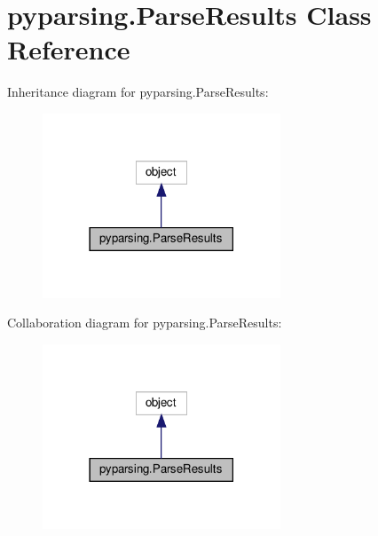 \hypertarget{classpyparsing_1_1ParseResults}{}\section{pyparsing.\+Parse\+Results Class Reference}
\label{classpyparsing_1_1ParseResults}


Inheritance diagram for pyparsing.\+Parse\+Results\+:
\nopagebreak
\begin{figure}[H]
\begin{center}
\leavevmode
\includegraphics[width=201pt]{classpyparsing_1_1ParseResults__inherit__graph}
\end{center}
\end{figure}


Collaboration diagram for pyparsing.\+Parse\+Results\+:
\nopagebreak
\begin{figure}[H]
\begin{center}
\leavevmode
\includegraphics[width=201pt]{classpyparsing_1_1ParseResults__coll__graph}
\end{center}
\end{figure}
